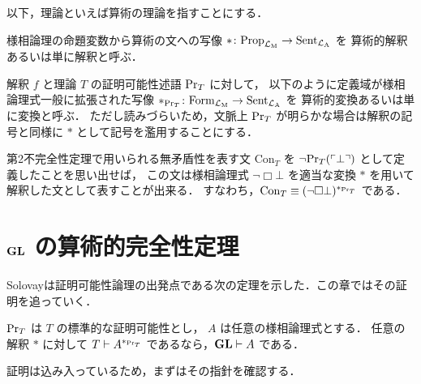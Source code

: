 \documentclass{jlreq}
\begin{document}
\begin{remark}
	以下，理論といえば算術の理論を指すことにする．
\end{remark}

\begin{definition}
	様相論理の命題変数から算術の文への写像 $* \colon \mathrm{Prop}_{\mathcal{L}_\mathrm{M}} \to \mathrm{Sent}_{\mathcal{L}_\mathrm{A}}$ を
	算術的解釈あるいは単に解釈と呼ぶ．
\end{definition}

\begin{definition}
	解釈 $f$ と理論 $T$ の証明可能性述語 $\mathrm{Pr}_T$ に対して，
	以下のように定義域が様相論理式一般に拡張された写像 $*_{\mathrm{Pr}_T} \colon \mathrm{Form}_{\mathcal{L}_\mathrm{M}} \to \mathrm{Sent}_{\mathcal{L}_\mathrm{A}}$ を
	算術的変換あるいは単に変換と呼ぶ．
	ただし読みづらいため，文脈上 $\mathrm{Pr}_T$ が明らかな場合は解釈の記号と同様に $*$ として記号を濫用することにする．
\end{definition}

\begin{example}
	第2不完全性定理で用いられる無矛盾性を表す文 $\mathrm{Con}_T$ を $\lnot \mathrm{Pr}_T(\ulcorner \bot \urcorner)$ として定義したことを思い出せば，
	この文は様相論理式 $\lnot \Box \bot$ を適当な変換 $*$ を用いて解釈した文として表すことが出来る．
	すなわち，$\mathrm{Con}_T \equiv (\lnot \Box \bot)^{*_{\mathrm{Pr}_T}}$ である．
\end{example}



\section{$\mathbf{GL}$ の算術的完全性定理}

Solovay\cite{solovay_provability_1976}は証明可能性論理の出発点である次の定理を示した．この章ではその証明を追っていく．

\begin{theorem}\label{thm:GL_arith_completeness}
	$\mathrm{Pr}_T$ は $T$ の標準的な証明可能性とし，
	$A$ は任意の様相論理式とする．
	任意の解釈 $*$ に対して $T \vdash A^{*_{\mathrm{Pr}_T}}$ であるなら，$\mathbf{GL} \vdash A$ である．
\end{theorem}

証明は込み入っているため，まずはその指針を確認する．
\end{document}
